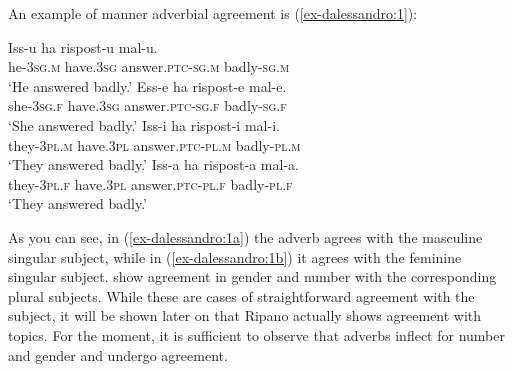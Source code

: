 \documentclass[output=paper
,modfonts
,nonflat]{langsci/langscibook}
\begin{document}
An example of manner adverbial agreement is (\ref{ex-dalessandro:1}):

\begin{exe}
\ex\label{ex-dalessandro:1} \citet[8]{Burroni_Et_Al2016} \xlist
	\ex \label{ex-dalessandro:1a}
	\gll Iss-u    ha    rispost-u     mal-u.\\
	he-3\textsc{sg.m}  have.\textsc{3sg}  answer.\textsc{ptc-sg.m}  badly-\textsc{sg.m}\\
	\glt `He answered badly.' 
	\ex\label{ex-dalessandro:1b}
	\gll Ess-e    ha    rispost-e     mal-e.\\
	she-\textsc{3sg.f}  have.\textsc{3sg}  answer\textsc{.ptc-sg.f}  badly-\textsc{sg.f}\\
	\glt `She answered badly.' 
	\ex\label{ex-dalessandro:1c}
	\gll Iss-i    ha     rispost-i    mal-i.\\
	they-\textsc{3pl.m} have.\textsc{3pl} answer.\textsc{ptc-pl.m}  badly-\textsc{pl.m}\\
	\glt `They answered badly.' 
	\ex\label{ex-dalessandro:1d}
	\gll Iss-a    ha    rispost-a    mal-a.\\
	they-\textsc{3pl.f} have.\textsc{3pl} answer.\textsc{ptc-pl.f}  badly-\textsc{pl.f}\\
	\glt `They answered badly.' 
\endxlist
\end{exe}
As you can see, in (\ref{ex-dalessandro:1a}) the adverb agrees with the masculine singular subject, while in (\ref{ex-dalessandro:1b}) it agrees with the feminine singular subject.  show agreement in gender and number with the corresponding plural subjects. While these are cases of straightforward agreement with the subject, it will be shown later on that Ripano actually shows agreement with topics. For the moment, it is sufficient to observe that adverbs inflect for number and gender and undergo agreement.
\end{document}
